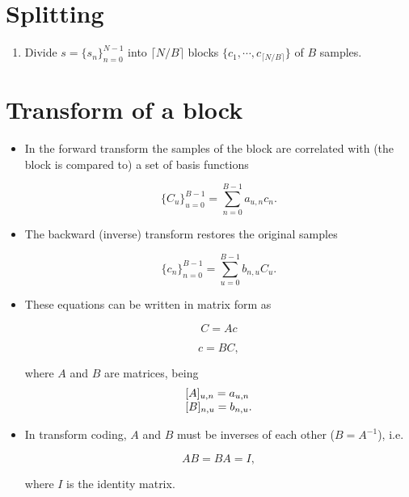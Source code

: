 \section{Splitting}
\begin{enumerate}
\tightlist
\item
  Divide \(s=\{s_n\}_{n=0}^{N-1}\) into \(\lceil N/B \rceil\) blocks
  \(\{c_1, \cdots, c_{\lceil N/B \rceil}\}\) of \(B\) samples.
\end{enumerate}

\section{Transform of a block}
\begin{itemize}
\item
  In the forward transform the samples of the block are correlated with
  (the block is compared to) a set of basis functions

  \begin{equation}
    \{C_u\}_{u=0}^{B-1} = \sum_{n=0}^{B-1}a_{u,n}c_n.
    \tag{forward\_transform}
  \end{equation}
\item
  The backward (inverse) transform restores the original samples

  \begin{equation}
    \{c_n\}_{n=0}^{B-1} = \sum_{u=0}^{B-1}b_{n,u}C_u.
    \tag{inverse\_transform}
  \end{equation}
\item
  These equations can be written in matrix form as

  \begin{equation}
    C=Ac
    \tag{forward\_transform\_matrix\_form}
  \end{equation}

  \begin{equation}
    c=BC,
    \tag{inverse\_transform\_matrix\_form}
  \end{equation}

  where \(A\) and \(B\) are matrices, being
  \begin{equation}
    \begin{array}{l}
    [A]_{u,n} = a_{u,n} \\\relax
    [B]_{n,u} = b_{n,u}.
    \end{array}
  \end{equation}

\item
  In transform coding, \(A\) and \(B\) must be inverses of each other
  (\(B=A^{-1}\)), i.e.

  \begin{equation}
    AB = BA = I,
  \end{equation}

  where \(I\) is the identity matrix.
\end{itemize}


